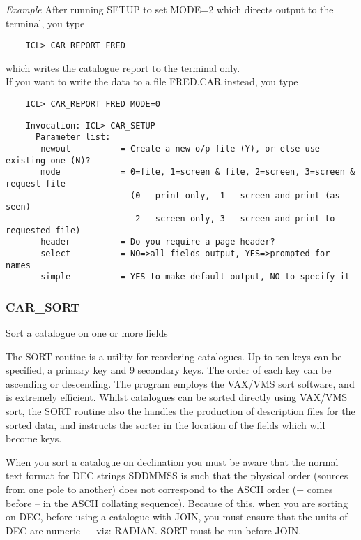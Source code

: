 {\em Example} After running SETUP to set MODE=2 which directs output to the
terminal, you type
\begin{verbatim}
    ICL> CAR_REPORT FRED
\end{verbatim}
which writes the catalogue report to the terminal only.\\
If you want to write the data to a file FRED.CAR instead, you type
\begin{verbatim}
    ICL> CAR_REPORT FRED MODE=0
\end{verbatim}
\begin{verbatim}
    Invocation: ICL> CAR_SETUP
      Parameter list:
       newout          = Create a new o/p file (Y), or else use existing one (N)?
       mode            = 0=file, 1=screen & file, 2=screen, 3=screen & request file
                         (0 - print only,  1 - screen and print (as seen)
                          2 - screen only, 3 - screen and print to requested file)
       header          = Do you require a page header?
       select          = NO=>all fields output, YES=>prompted for names
       simple          = YES to make default output, NO to specify it
\end{verbatim}

\subsubsection{CAR\_SORT}

Sort a catalogue on one or more fields

The SORT routine is a utility for reordering catalogues.  
Up to ten keys can be specified, a primary key and 9 secondary keys.
The order of each key can be ascending or descending.
The program employs the VAX/VMS sort software, and is extremely efficient.
Whilst catalogues can be sorted directly using VAX/VMS sort, the SORT 
routine also the handles the production of description files for the sorted 
data, and instructs the sorter in the location of the fields which will
become keys.

When you sort a catalogue on declination you must be aware that the normal 
text format for DEC strings SDDMMSS is such that the physical order (sources 
from one pole to another) does not correspond to the ASCII order (+ comes 
before -- in the ASCII collating sequence). 
Because of this, when you are sorting on DEC, before using a catalogue with
JOIN, you must ensure that the units of DEC are numeric --- viz: RADIAN.
SORT must be run before JOIN.

